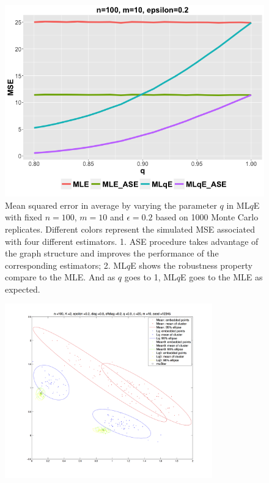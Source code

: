 \documentclass[a4paper]{article}
\begin{document}
\begin{figure}[!htb]
\centering
\includegraphics[width=1\textwidth]{q.png}
\caption{Mean squared error in average by varying the parameter $q$ in ML$q$E with fixed $n = 100$, $m = 10$ and $\epsilon = 0.2$ based on 1000 Monte Carlo replicates. Different colors represent the simulated MSE associated with four different estimators.
1. ASE procedure takes advantage of the graph structure and improves the performance of the corresponding estimators;
2. ML$q$E shows the robustness property compare to the MLE. And as $q$ goes to 1, ML$q$E goes to the MLE as expected.}
\label{fig:q}
\end{figure}

  
\begin{figure}
\centering
\includegraphics[width=0.8\textwidth]{Cluster.png}
\end{figure}
\end{document}

